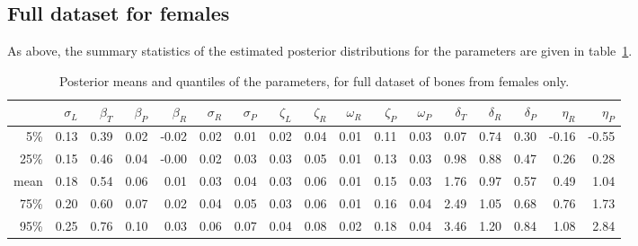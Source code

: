 \documentclass[12pt]{article}
\begin{document}
\subsection*{Full dataset for females}

As above, the summary statistics of the estimated posterior distributions 
for the parameters
are given in table~\ref{tab:females_posterior_distrns}.

\begin{table}[ht]
    \footnotesize
\centering
\begin{tabular}{rrrrrrrrrrrrrrrrr}
  \hline
        &  $\sigma_L$  &  $\beta_T$  &  $\beta_P$  &  $\beta_R$  &  $\sigma_R$  &  $\sigma_P$  &  $\zeta_L$  &  $\zeta_R$  &  $\omega_R$  &  $\zeta_P$  &  $\omega_P$  &  $\delta_T$  &  $\delta_R$  &  $\delta_P$  &  $\eta_R$  &  $\eta_P$  \\
\hline
5\%     &  0.13        &  0.39       &  0.02       &  -0.02      &  0.02        &  0.01        &  0.02       &  0.04       &  0.01        &  0.11       &  0.03        &  0.07        &  0.74        &  0.30        &  -0.16     &  -0.55     \\
25\%    &  0.15        &  0.46       &  0.04       &  -0.00      &  0.02        &  0.03        &  0.03       &  0.05       &  0.01        &  0.13       &  0.03        &  0.98        &  0.88        &  0.47        &  0.26      &  0.28      \\
mean    &  0.18        &  0.54       &  0.06       &  0.01       &  0.03        &  0.04        &  0.03       &  0.06       &  0.01        &  0.15       &  0.03        &  1.76        &  0.97        &  0.57        &  0.49      &  1.04      \\
75\%    &  0.20        &  0.60       &  0.07       &  0.02       &  0.04        &  0.05        &  0.03       &  0.06       &  0.01        &  0.16       &  0.04        &  2.49        &  1.05        &  0.68        &  0.76      &  1.73      \\
95\%    &  0.25        &  0.76       &  0.10       &  0.03       &  0.06        &  0.07        &  0.04       &  0.08       &  0.02        &  0.18       &  0.04        &  3.46        &  1.20        &  0.84        &  1.08      &  2.84      \\
   \hline
\end{tabular}
\caption{ \label{tab:females_posterior_distrns} Posterior means and quantiles of the parameters, for full dataset of bones from females only.  
}
\end{table}
\end{document}
